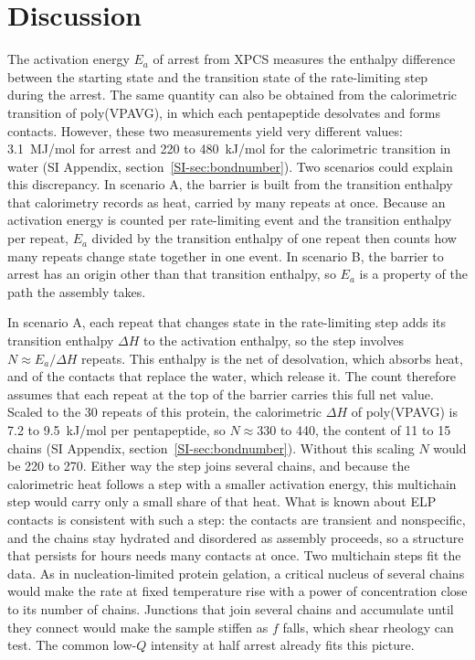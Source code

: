 \documentclass[journal=nalefd,manuscript=letter,layout=traditional]{achemso}
\begin{document}
\section*{Discussion}
The activation energy $E_a$ of arrest from XPCS measures the enthalpy difference between the starting state and the transition state of the rate-limiting step during the arrest. The same quantity can also be obtained from the calorimetric transition of poly(VPAVG), in which each pentapeptide desolvates and forms contacts. However, these two measurements yield very different values: 3.1~MJ/mol for arrest and 220 to 480~kJ/mol for the calorimetric transition in water\cite{Reguera2003-ma} (SI Appendix, section~\ref*{SI-sec:bondnumber}). Two scenarios could explain this discrepancy. In scenario A, the barrier is built from the transition enthalpy that calorimetry records as heat, carried by many repeats at once. Because an activation energy is counted per rate-limiting event and the transition enthalpy per repeat, $E_a$ divided by the transition enthalpy of one repeat then counts how many repeats change state together in one event. In scenario B, the barrier to arrest has an origin other than that transition enthalpy, so $E_a$ is a property of the path the assembly takes.

In scenario A, each repeat that changes state in the rate-limiting step adds its transition enthalpy $\Delta H$ to the activation enthalpy, so the step involves $N\approx E_a/\Delta H$ repeats. This enthalpy is the net of desolvation, which absorbs heat, and of the contacts that replace the water, which release it.\cite{Girotti2004-ma,Ribeiro2009-bj} The count therefore assumes that each repeat at the top of the barrier carries this full net value. Scaled to the 30 repeats of this protein, the calorimetric $\Delta H$ of poly(VPAVG) is 7.2 to 9.5~kJ/mol per pentapeptide,\cite{Luan1991-bp,Reguera2003-ma,Ribeiro2009-bj,Girotti2004-ma} so $N\approx330$ to 440, the content of 11 to 15 chains (SI Appendix, section~\ref*{SI-sec:bondnumber}). Without this scaling $N$ would be 220 to 270. Either way the step joins several chains, and because the calorimetric heat follows a step with a smaller activation energy, this multichain step would carry only a small share of that heat. What is known about ELP contacts is consistent with such a step: the contacts are transient and nonspecific,\cite{Reichheld2017-pnas} and the chains stay hydrated and disordered as assembly proceeds,\cite{Rauscher2017-elife} so a structure that persists for hours needs many contacts at once. Two multichain steps fit the data. As in nucleation-limited protein gelation,\cite{Hofrichter1974-pnas,Ferrone1999-me} a critical nucleus of several chains would make the rate at fixed temperature rise with a power of concentration close to its number of chains.\cite{Ford1997-pre} Junctions that join several chains and accumulate until they connect would make the sample stiffen as $f$ falls, which shear rheology can test. The common low-$Q$ intensity at half arrest already fits this picture.
\end{document}
